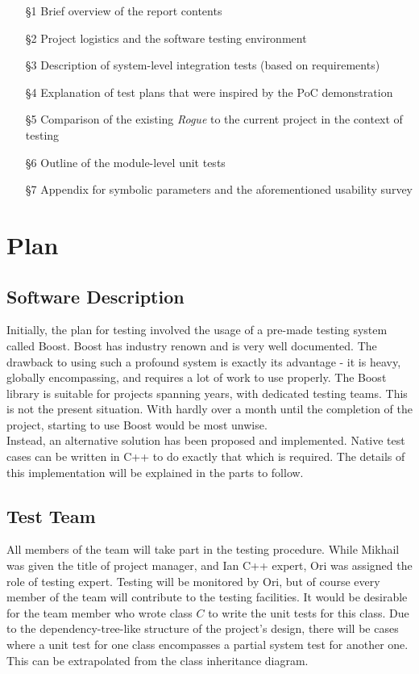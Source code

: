 \documentclass[12pt, titlepage]{article}
\begin{document}
		\begin{itemize}
			\item[\S 1] Brief overview of the report contents
			\item[\S 2] Project logistics and the software testing environment
			\item[\S 3] Description of system-level integration tests (based on requirements)
			\item[\S 4] Explanation of test plans that were inspired by the PoC demonstration
			\item[\S 5] Comparison of the existing \textit{Rogue} to the current project in the context of testing
			\item[\S 6] Outline of the module-level unit tests 
			\item[\S 7] Appendix for symbolic parameters and the aforementioned usability survey
		\end{itemize}

\newpage
\section{Plan}
		
	\subsection{Software Description}

	Initially, the plan for testing involved the usage of a pre-made testing system called Boost. Boost has industry renown and is very well documented. The drawback to using such a profound system is exactly its advantage - it is heavy, globally encompassing, and requires a lot of work to use properly. The Boost library is suitable for projects spanning years, with dedicated testing teams. This is not the present situation. With hardly over a month until the completion of the project, starting to use Boost would be most unwise.\\

	Instead, an alternative solution has been proposed and implemented. Native test cases can be written in C++ to do exactly that which is required. The details of this implementation will be explained in the parts to follow.

	\subsection{Test Team}

	All members of the team will take part in the testing procedure. While Mikhail was given the title of project manager, and Ian C++ expert, Ori was assigned the role of testing expert. Testing will be monitored by Ori, but of course every member of the team will contribute to the testing facilities. It would be desirable for the team member who wrote class $C$ to write the unit tests for this class. Due to the dependency-tree-like structure of the project's design, there will be cases where a unit test for one class encompasses a partial system test for another one. This can be extrapolated from the class inheritance diagram.
\end{document}
